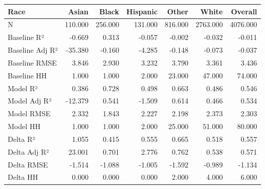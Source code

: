 \begin{tabular}{lrrrrrr}
\toprule
Race &   Asian &   Black &  Hispanic &   Other &    White &  Overall \\
\midrule
N               & 110.000 & 256.000 &   131.000 & 816.000 & 2763.000 & 4076.000 \\
Baseline R²     &  -0.669 &   0.313 &    -0.057 &  -0.002 &   -0.032 &   -0.011 \\
Baseline Adj R² & -35.380 &  -0.160 &    -4.285 &  -0.148 &   -0.073 &   -0.037 \\
Baseline RMSE   &   3.846 &   2.930 &     3.232 &   3.790 &    3.361 &    3.436 \\
Baseline HH     &   1.000 &   1.000 &     2.000 &  23.000 &   47.000 &   74.000 \\
Model R²        &   0.386 &   0.728 &     0.498 &   0.663 &    0.486 &    0.546 \\
Model Adj R²    & -12.379 &   0.541 &    -1.509 &   0.614 &    0.466 &    0.534 \\
Model RMSE      &   2.332 &   1.843 &     2.227 &   2.198 &    2.373 &    2.303 \\
Model HH        &   1.000 &   1.000 &     2.000 &  25.000 &   51.000 &   80.000 \\
Delta R²        &   1.055 &   0.415 &     0.555 &   0.665 &    0.518 &    0.557 \\
Delta Adj R²    &  23.001 &   0.701 &     2.776 &   0.762 &    0.538 &    0.571 \\
Delta RMSE      &  -1.514 &  -1.088 &    -1.005 &  -1.592 &   -0.989 &   -1.134 \\
Delta HH        &   0.000 &   0.000 &     0.000 &   2.000 &    4.000 &    6.000 \\
\bottomrule
\end{tabular}
